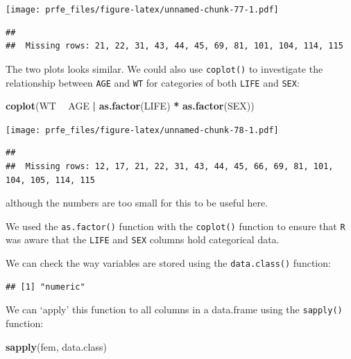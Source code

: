 \documentclass[12pt,]{book}
\newenvironment{Shaded}{\begin{snugshade}}{\end{snugshade}}
\newcommand{\KeywordTok}[1]{\textcolor[rgb]{0.13,0.29,0.53}{\textbf{#1}}}
\newcommand{\StringTok}[1]{\textcolor[rgb]{0.31,0.60,0.02}{#1}}
\newcommand{\OperatorTok}[1]{\textcolor[rgb]{0.81,0.36,0.00}{\textbf{#1}}}
\newcommand{\NormalTok}[1]{#1}
\theoremstyle{definition}
\theoremstyle{definition}
\theoremstyle{definition}
\theoremstyle{remark}
\begin{document}
\texttt{[image: prfe\_files/figure-latex/unnamed-chunk-77-1.pdf]}

\begin{verbatim}
## 
##  Missing rows: 21, 22, 31, 43, 44, 45, 69, 81, 101, 104, 114, 115
\end{verbatim}

The two plots looks similar. We could also use \texttt{coplot()} to
investigate the relationship between \texttt{AGE} and \texttt{WT} for
categories of both \texttt{LIFE} and \texttt{SEX}:

\begin{Shaded}
\begin{Highlighting}[]
\KeywordTok{coplot}\NormalTok{(WT }\OperatorTok{~}\StringTok{ }\NormalTok{AGE }\OperatorTok{|}\StringTok{ }\KeywordTok{as.factor}\NormalTok{(LIFE) }\OperatorTok{*}\StringTok{ }\KeywordTok{as.factor}\NormalTok{(SEX))}
\end{Highlighting}
\end{Shaded}

\texttt{[image: prfe\_files/figure-latex/unnamed-chunk-78-1.pdf]}

\begin{verbatim}
## 
##  Missing rows: 12, 17, 21, 22, 31, 43, 44, 45, 66, 69, 81, 101, 104, 105, 114, 115
\end{verbatim}

although the numbers are too small for this to be useful here.

We used the \texttt{as.factor()} function with the \texttt{coplot()}
function to ensure that \texttt{R} was aware that the \texttt{LIFE} and
\texttt{SEX} columns hold categorical data.

We can check the way variables are stored using the
\texttt{data.class()} function:

\begin{Shaded}
\end{Shaded}

\begin{verbatim}
## [1] "numeric"
\end{verbatim}

We can `apply' this function to all columns in a data.frame using the
\texttt{sapply()} function:

\begin{Shaded}
\begin{Highlighting}[]
\KeywordTok{sapply}\NormalTok{(fem, data.class)}
\end{Highlighting}
\end{Shaded}
\end{document}
